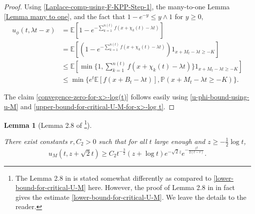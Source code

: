 \documentclass[a4paper,reqno]{amsart}%
\newcommand{\1}{\mathbf 1}
\theoremstyle{mine}
\numberwithin{theorem}{section}
\newtheorem{lemma}[theorem]{Lemma}
\numberwithin{equation}{section}
\theoremstyle{remark}
\begin{document}
\begin{proof}
    Using \eqref{Laplace-comp-using-F-KPP-Step-1}, the many-to-one Lemma \ref{Lemma many to one}, and the fact that $1-e^{-y} \leq y \wedge 1$ for $y\geq 0$, 
\begin{align} 
    \nonumber u_\phi(t, \lambda t -x) &= \mathbb{E}[1 -e^{-\sum_{k=1}^{n(t)} f(x + \chi_k(t) -\lambda t )}] \\
    \nonumber &= \mathbb{E}[(1 -e^{-\sum_{k=1}^{n(t)} f(x + \chi_k(t) -\lambda t )})1_{x+ M_t -\lambda t \geq -K}]\\
    \nonumber &\leq \mathbb{E}[\min \bigl\{1, \sum_{k=1}^{n(t)} f(x + \chi_k(t) -\lambda t )\bigr\} 1_{x + M_t -\lambda t \geq -K}] \\
    \nonumber & \leq \min \bigl\{e^t \mathbb{E}[f(x+ B_t - \lambda t)], \mathbb{P}(x+ M_t -\lambda t \geq -K)\bigr\}.
\end{align}

The claim \eqref{convegence-zero-for-x>-log(t)} follows easily using \eqref{u-phi-bound-using-u-M} and \eqref{upper-bound-for-critical-U-M-for-x>-log t}. 

\end{proof}
























\begin{lemma}[Lemma 2.8 of \cite{Shekhar_Domain}\footnote{The Lemma 2.8 in \cite{Shekhar_Domain} is stated somewhat differently as compared to \eqref{lower-bound-for-critical-U-M} here. However, the proof of Lemma 2.8 in \cite{Shekhar_Domain} in fact gives the estimate \eqref{lower-bound-for-critical-U-M}. We leave the details to the reader.}] \label{critical-case-lower-bound}

There exist constants $r, C_2 >0$ such that for all $t$ large enough and $z\geq -\frac{1}{2} \log t $, 
    \begin{equation}\label{lower-bound-for-critical-U-M}
u_M(t,z+\sqrt 2t) \ge C_2 t^{-\frac{3}{2}} (z+\log t)e^{-\sqrt 2 z}e^{-\frac{z^2}{2(t-r)}}.
\end{equation}
\end{lemma}
\end{document}
